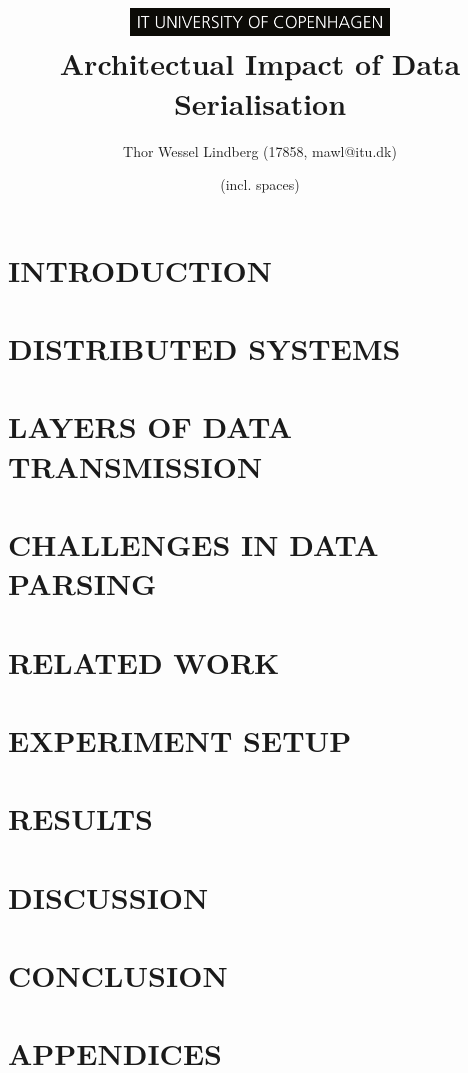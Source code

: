 \documentclass[10pt, twocolumn, letterpaper]{article}
\title{
    \includegraphics[height=0.75cm]{logo.jpg} \\
    \vspace{1.25cm}
    \LARGE \textbf{Architectual Impact of Data Serialisation} \\
}
\author{Thor Wessel Lindberg (17858, mawl@itu.dk)}
\date{\charactercount{main} (incl. spaces)}
\begin{document}
\maketitle



\section{INTRODUCTION}


\section{DISTRIBUTED SYSTEMS}


\section{LAYERS OF DATA TRANSMISSION}


\section{CHALLENGES IN DATA PARSING}


\section{RELATED WORK}


\section{EXPERIMENT SETUP}


\section{RESULTS}


\section{DISCUSSION}


\section{CONCLUSION}


\pagebreak



\onecolumn
\centering
\pagebreak

\section{APPENDICES}

\end{document}
